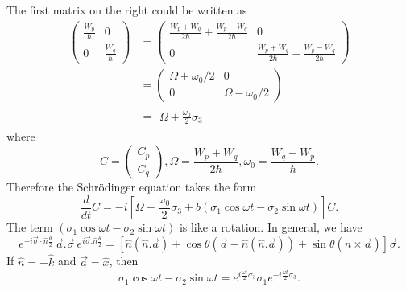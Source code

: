 The first matrix on the right could be written as
\begin{align}
\left( \begin{array}{cc}
\frac{W_p}{\hbar} & 0 \\
0 & \frac{W_q}{\hbar}
\end{array} \right) &= \left(
\begin{array}{cc}
\frac{W_p+W_q}{2\hbar} + \frac{W_p-W_q}{2\hbar} & 0 \\
0 & \frac{W_p+W_q}{2\hbar}-\frac{W_p-W_q}{2\hbar}
\end{array} \right) \\ \nonumber
                  &= \left(
\begin{array}{cc}
  \Omega + \omega_0/2 & 0 \\
  0 & \Omega - \omega_0/2
\end{array} \right) \\ \nonumber
                  & =
                    \begin{array}{cc}
           \Omega + \frac{\omega_0}{2} \sigma_3           
                    \end{array} 
\end{align}
where
\begin{equation}
C=\left( \begin{array}{c}
C_p \\
C_q
\end{array}\right) , 
\Omega=\frac{W_p+W_q}{2\hbar} ,
\omega_0=\frac{W_q-W_p}{\hbar}.
\end{equation}
Therefore the Schr\"{o}dinger equation takes the form
\begin{equation}
\frac{d}{dt}C= -i \left[
\Omega -\frac{\omega_0}{2}\sigma_3 + b \left(\sigma_1 \cos{\omega t}  - \sigma_2\sin{\omega t}  \right) \right]C.
\end{equation}
The term $\left( \sigma_1\cos{\omega t}  - \sigma_2 \sin{\omega t}  \right)$ is like a rotation. In general, we have
\begin{equation}
e^{-i \vec{\sigma}\cdot\hat{n} \frac{\theta}{2}}~ \vec{a}. \vec{\sigma} ~e^{i \vec{\sigma}.\hat{n} \frac{\theta}{2}}=\left[ \hat{n}(\hat{n}.\vec{a})+\cos\theta (\vec{a} - \hat{n} (\hat{n}.\vec{a}))+\sin \theta (\hat{n} \times \vec{a} )\right] \vec{\sigma} .
\end{equation}
If $\hat{n}=-\hat{k}$ and $\vec{a}=\hat{x}$, then
\begin{equation}
\sigma_1 \cos{\omega t} - \sigma_2 \sin{\omega t} = e^{i \frac{\omega t}{2} \sigma_3} \sigma_1 e^{-i \frac{\omega t}{2}\sigma_3}.
\end{equation}
